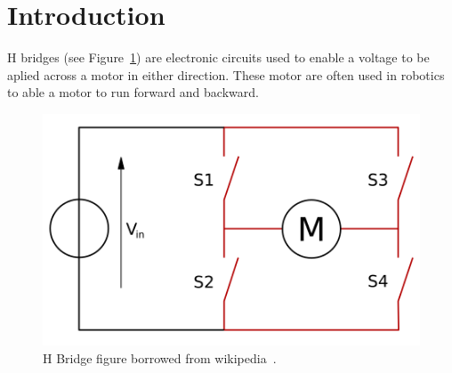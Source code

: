 \section{\textbf{Introduction}}\label{sec:1}
	

	H bridges (see Figure~\ref{fig:bridge}) are electronic circuits used to enable a voltage to be aplied across a motor in either direction. These motor are often used in robotics to able a motor to run forward and backward.

\begin{figure}[t]
\centering
	\centering%
	\includegraphics[height=.25\textwidth]{img/H_bridge.png}
	\caption{H Bridge figure borrowed from wikipedia~\cite{WIKI}.}\label{fig:bridge}%
\end{figure}


